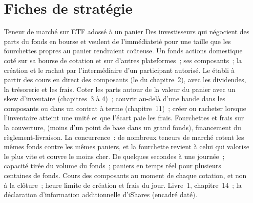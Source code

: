 \section{Fiches de stratégie}

\begin{strategyfile}{Teneur de marché sur ETF adossé à un panier}\label{strat:hf:etf-market-making:equity}
 Des investisseurs qui négocient des parts du fonds en bourse et veulent de l'immédiateté pour une taille que les fourchettes propres au panier rendraient coûteuse.
 Un fonds actions domestique coté sur sa bourse de cotation et sur d'autres plateformes~; ses composants~; la création et le rachat par
l'intermédiaire d'un participant autorisé.
 Le  établi à partir des cours en direct des composants (le  du chapitre~2), avec les dividendes, la trésorerie et les frais.
 Coter les parts autour de la valeur du panier avec un skew d'inventaire (chapitres~3 à 4)~; couvrir au-delà d'une bande dans les
composants ou dans un contrat à terme (chapitre~11)~; créer ou racheter lorsque l'inventaire atteint une unité et que l'écart paie les frais.
 Fourchettes et frais sur la couverture,  (moins d'un point de base dans un grand fonds), financement du règlement-livraison.
 La concurrence~: de nombreux teneurs de marché cotent les mêmes fonds contre les mêmes paniers, et la fourchette revient à celui qui valorise le plus vite et
couvre le moins cher.
 De quelques secondes à une journée~; capacité tirée du volume du fonds~; paniers en temps réel pour plusieurs centaines de fonds.
 Cours des composants au moment de chaque cotation, et non à la clôture~; heure limite de création et frais du jour.
 Livre~1, chapitre~14~; la déclaration d'information additionnelle d'iShares (encadré daté).
\end{strategyfile}

